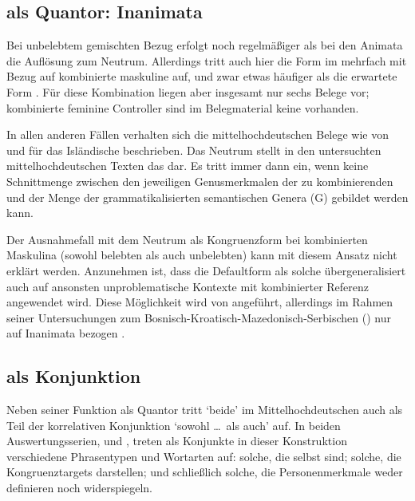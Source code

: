 
\subsection{ als Quantor: Inanimata}

Bei unbelebtem gemischten Bezug erfolgt noch regelmäßiger als bei den
Animata die Auflösung zum Neutrum. Allerdings
tritt auch hier die Form  im \CAO{} mehrfach mit Bezug auf
kombinierte maskuline  auf, und zwar etwas häufiger als die
erwartete Form . Für diese Kombination liegen aber insgesamt nur
sechs Belege vor; kombinierte feminine Controller sind im Belegmaterial keine
vorhanden.

In allen anderen Fällen verhalten sich die
mittelhochdeutschen Belege wie von
\citet{wechslerzlatic2003} und \citet{wechsler2009} für das
Isländische beschrieben. Das Neutrum stellt in den untersuchten
mittelhochdeutschen Texten das  dar. Es
tritt immer dann ein, wenn keine Schnittmenge zwischen den jeweiligen
Genusmerkmalen der zu kombinierenden  und der
Menge der grammatikalisierten semantischen Genera (G)
gebildet werden kann.

Der Ausnahmefall mit dem Neutrum als Kongruenzform bei
kombinierten Maskulina (sowohl belebten als auch
unbelebten) kann mit diesem Ansatz nicht erklärt werden.
Anzunehmen ist, dass die Defaultform als solche
übergeneralisiert auch auf ansonsten unproblematische
Kontexte mit kombinierter Referenz angewendet wird. Diese Möglichkeit wird von
\citet[302]{corbett1991} angeführt, allerdings im Rahmen seiner Untersuchungen
zum
Bosnisch-\allowbreak{}Kroatisch-\allowbreak{}Mazedonisch-\allowbreak{}Serbischen
() nur auf Inanimata bezogen
\autocites[vgl.~auch][190]{wechslerzlatic2003}[581]{wechsler2009}.


\subsection{ als Konjunktion}

Neben seiner Funktion als Quantor tritt `beide' im
Mittelhochdeutschen auch als Teil der korrelativen
Konjunktion  `sowohl \dots\ als auch' auf. In beiden
Auswertungs\-serien, \CAO{} und \KC{}, treten als Konjunkte in dieser
Konstruktion verschiedene Phrasen\-typen und Wort\-arten auf: solche, die
selbst  sind; solche, die Kongruenztargets
darstellen; und schließlich solche, die Personenmerkmale
weder definieren noch widerspiegeln.


